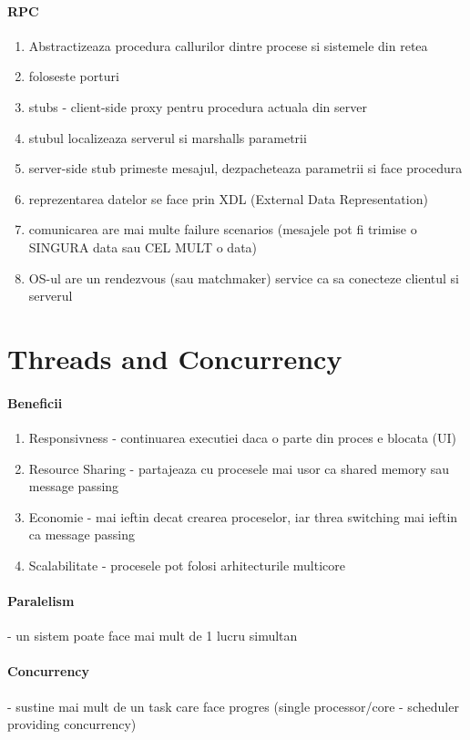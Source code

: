 \documentclass{article}
\begin{document}
\paragraph*{RPC}
\begin{enumerate}
    \item Abstractizeaza procedura callurilor dintre procese si sistemele din retea
    \item foloseste porturi
    \item stubs - client-side proxy pentru procedura actuala din server
    \item stubul localizeaza serverul si marshalls parametrii
    \item server-side stub primeste mesajul, dezpacheteaza parametrii si face procedura
    \item reprezentarea datelor se face prin XDL (External Data Representation)
    \item comunicarea are mai multe failure scenarios (mesajele pot fi trimise o SINGURA data sau CEL MULT o data)
    \item OS-ul are un rendezvous (sau matchmaker) service ca sa conecteze clientul si serverul
\end{enumerate}

\section[Ch4 Threads and Concurrency]{Threads and Concurrency}
\paragraph*{Beneficii}
\begin{enumerate}
    \item Responsivness - continuarea executiei daca o parte din proces e blocata (UI)
    \item Resource Sharing - partajeaza cu procesele mai usor ca shared memory sau message passing
    \item Economie - mai ieftin decat crearea proceselor, iar threa switching mai ieftin ca message passing
    \item Scalabilitate - procesele pot folosi arhitecturile multicore
\end{enumerate}

\paragraph*{Paralelism} - un sistem poate face mai mult de 1 lucru simultan
\paragraph*{Concurrency} - sustine mai mult de un task care face progres (single processor/core - scheduler providing concurrency)
\end{document}
